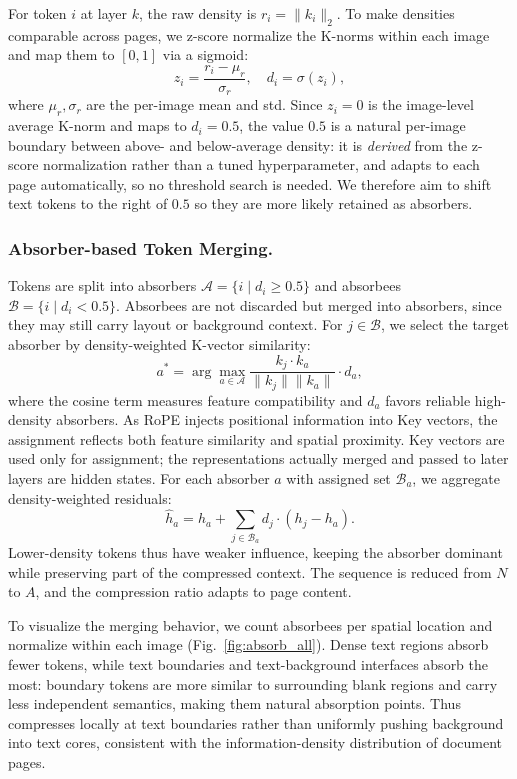 For token $i$ at layer $k$, the raw density is $r_i=\|k_i\|_2$. To make densities comparable across pages, we z-score normalize the K-norms within each image and map them to $[0,1]$ via a sigmoid:
\begin{equation}
z_i=\frac{r_i-\mu_r}{\sigma_r}, \quad d_i=\sigma(z_i),
\end{equation}
where $\mu_r,\sigma_r$ are the per-image mean and std. Since $z_i=0$ is the image-level average K-norm and maps to $d_i=0.5$, the value $0.5$ is a natural per-image boundary between above- and below-average density: it is \emph{derived} from the z-score normalization rather than a tuned hyperparameter, and adapts to each page automatically, so no threshold search is needed. We therefore aim to shift text tokens to the right of $0.5$ so they are more likely retained as absorbers.

\subsubsection{Absorber-based Token Merging.}

Tokens are split into absorbers $\mathcal{A}=\{i\mid d_i\ge0.5\}$ and absorbees $\mathcal{B}=\{i\mid d_i<0.5\}$. Absorbees are not discarded but merged into absorbers, since they may still carry layout or background context. For $j\in\mathcal{B}$, we select the target absorber by density-weighted K-vector similarity:
\begin{equation}
a^*=\arg\max_{a\in\mathcal{A}}
\frac{k_j\cdot k_a}{\|k_j\|\|k_a\|}\cdot d_a,
\end{equation}
where the cosine term measures feature compatibility and $d_a$ favors reliable high-density absorbers. As RoPE injects positional information into Key vectors, the assignment reflects both feature similarity and spatial proximity. Key vectors are used only for assignment; the representations actually merged and passed to later layers are hidden states. For each absorber $a$ with assigned set $\mathcal{B}_a$, we aggregate density-weighted residuals:
\begin{equation}
\hat{h}_a=h_a+\sum_{j\in\mathcal{B}_a}d_j\cdot(h_j-h_a).
\label{eq:merge}
\end{equation}
Lower-density tokens thus have weaker influence, keeping the absorber dominant while preserving part of the compressed context. The sequence is reduced from $N$ to $A$, and the compression ratio adapts to page content.

To visualize the merging behavior, we count absorbees per spatial location and normalize within each image (Fig.~\ref{fig:absorb_all}). Dense text regions absorb fewer tokens, while text boundaries and text-background interfaces absorb the most: boundary tokens are more similar to surrounding blank regions and carry less independent semantics, making them natural absorption points. Thus \ours{} compresses locally at text boundaries rather than uniformly pushing background into text cores, consistent with the information-density distribution of document pages.

